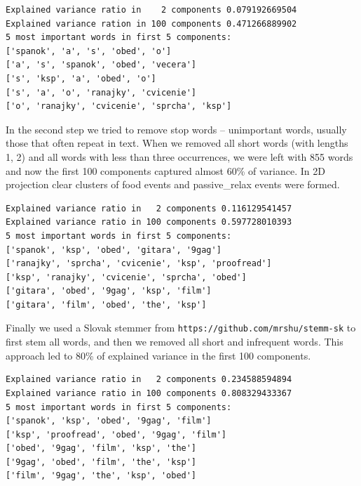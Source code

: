 \documentclass[a4paper, 12pt]{article}
\begin{document}
\begin{small}
\begin{verbatim}
Explained variance ratio in    2 components 0.079192669504
Explained variance ration in 100 components 0.471266889902
5 most important words in first 5 components:
['spanok', 'a', 's', 'obed', 'o']
['a', 's', 'spanok', 'obed', 'vecera']
['s', 'ksp', 'a', 'obed', 'o']
['s', 'a', 'o', 'ranajky', 'cvicenie']
['o', 'ranajky', 'cvicenie', 'sprcha', 'ksp']
\end{verbatim}
\end{small}

\medskip

In the second step we tried to remove stop words -- unimportant words, usually those
that often repeat in text. When we removed all short words (with lengths 1, 2)
and all words with less than three occurrences, we were left with 855 words and now
the first 100 components captured almost 60\% of variance. In 2D projection
clear clusters of food events and passive\_relax events were formed.

\begin{small}
\begin{verbatim}
Explained variance ratio in   2 components 0.116129541457
Explained variance ratio in 100 components 0.597728010393
5 most important words in first 5 components:
['spanok', 'ksp', 'obed', 'gitara', '9gag']
['ranajky', 'sprcha', 'cvicenie', 'ksp', 'proofread']
['ksp', 'ranajky', 'cvicenie', 'sprcha', 'obed']
['gitara', 'obed', '9gag', 'ksp', 'film']
['gitara', 'film', 'obed', 'the', 'ksp']
\end{verbatim}
\end{small}

\medskip

Finally we used a Slovak stemmer from \texttt{https://github.com/mrshu/stemm-sk}
to first stem all words, and then we removed all short and infrequent words.
This approach led to 80\% of explained variance in the first 100 components.

\begin{small}
\begin{verbatim}
Explained variance ratio in   2 components 0.234588594894
Explained variance ratio in 100 components 0.808329433367
5 most important words in first 5 components:
['spanok', 'ksp', 'obed', '9gag', 'film']
['ksp', 'proofread', 'obed', '9gag', 'film']
['obed', '9gag', 'film', 'ksp', 'the']
['9gag', 'obed', 'film', 'the', 'ksp']
['film', '9gag', 'the', 'ksp', 'obed']
\end{verbatim}
\end{small}
\end{document}
